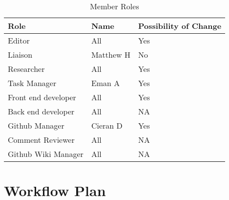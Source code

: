 \documentclass{article}
\begin{document}
\begin{table}[H]
\caption{Member Roles} \label{Proposed Assignments}
\begin{tabularx}{\textwidth}{llX}
\toprule
\textbf{Role} & \textbf{Name} & \textbf{Possibility of Change}\\
\midrule
Editor & All & Yes\\
Liaison & Matthew H  & No\\
Researcher & All & Yes \\
Task Manager & Eman A & Yes \\
Front end developer & All & Yes \\
Back end developer & All & NA \\
Github Manager & Cieran D & Yes \\
Comment Reviewer & All & NA \\
Github Wiki Manager & All & NA \\
\bottomrule
\end{tabularx}
\end{table}



\section{Workflow Plan}
\end{document}
